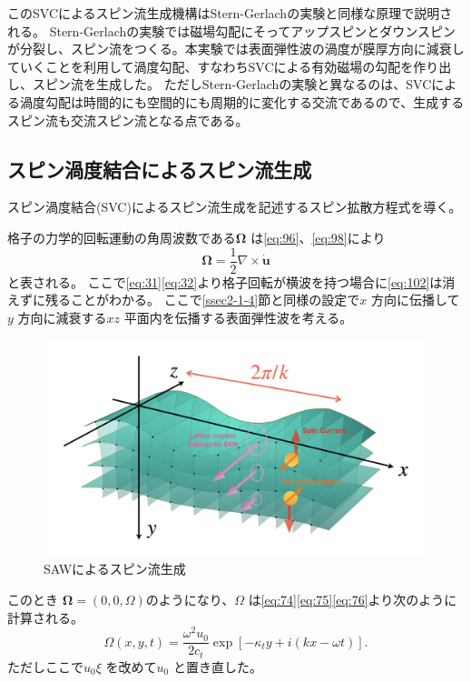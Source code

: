 \documentclass[dvipdfmx,11pt]{jsreport}
\numberwithin{equation}{chapter}
\numberwithin{table}{chapter}
\begin{document}
このSVCによるスピン流生成機構はStern-Gerlachの実験と同様な原理で説明される。
Stern-Gerlachの実験では磁場勾配にそってアップスピンとダウンスピンが分裂し、スピン流をつくる。本実験では表面弾性波の渦度が膜厚方向に減衰していくことを利用して渦度勾配、すなわちSVCによる有効磁場の勾配を作り出し、スピン流を生成した。
ただしStern-Gerlachの実験と異なるのは、SVCによる渦度勾配は時間的にも空間的にも周期的に変化する交流であるので、生成するスピン流も交流スピン流となる点である。
\subsection{スピン渦度結合によるスピン流生成}
\label{sec224}
スピン渦度結合(SVC)によるスピン流生成を記述するスピン拡散方程式を導く。

格子の力学的回転運動の角周波数である$\bm{\Omega}$ は\eqref{eq:96}、\eqref{eq:98}により
\begin{equation}
\label{eq:102}
	\bm{\Omega}=\frac{1}{2} \nabla \times \dot{\bm{u}}
\end{equation}
と表される。
ここで\eqref{eq:31}\eqref{eq:32}より格子回転が横波を持つ場合に\eqref{eq:102}は消えずに残ることがわかる。
ここで\ref{ssec2-1-4}節と同様の設定で$x$ 方向に伝播して$y$ 方向に減衰する$xz$ 平面内を伝播する表面弾性波を考える。
\begin{figure}[H]
	\centering
	\includegraphics[width=\textwidth]{fig/fig.002.jpeg}
	\caption{SAWによるスピン流生成}
	\label{fig:fig-fig-002-jpeg}
\end{figure}
このとき
$\bm{\Omega}=(0,0,\Omega)$のようになり、$\Omega$ は\eqref{eq:74}\eqref{eq:75}\eqref{eq:76}より次のように計算される。
\begin{equation}
\label{eq:103}
	\Omega(x,y,t)=\frac{\omega^2u_0}{2c_t}\exp \left[ -\kappa_t y+i(kx-\omega t) \right] 
.\end{equation}
ただしここで$u_0 \xi$ を改めて$u_0$ と置き直した。
\end{document}
